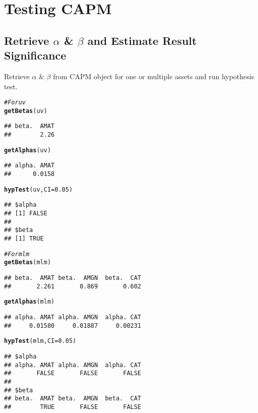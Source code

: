 \documentclass[a4paper]{article}\usepackage[]{graphicx}\usepackage[]{color}
\makeatletter
\newcommand{\hlnum}[1]{\textcolor[rgb]{0.686,0.059,0.569}{#1}}%
\newcommand{\hlcom}[1]{\textcolor[rgb]{0.678,0.584,0.686}{\textit{#1}}}%
\newcommand{\hlstd}[1]{\textcolor[rgb]{0.345,0.345,0.345}{#1}}%
\newcommand{\hlkwc}[1]{\textcolor[rgb]{0.333,0.667,0.333}{#1}}%
\newcommand{\hlkwd}[1]{\textcolor[rgb]{0.737,0.353,0.396}{\textbf{#1}}}%
\newenvironment{kframe}{%
 \def\at@end@of@kframe{}%
 \ifinner\ifhmode%
  \def\at@end@of@kframe{\end{minipage}}%
  \begin{minipage}{\columnwidth}%
 \fi\fi%
 \def\FrameCommand##1{\hskip\@totalleftmargin \hskip-\fboxsep
 \colorbox{shadecolor}{##1}\hskip-\fboxsep
     \hskip-\linewidth \hskip-\@totalleftmargin \hskip\columnwidth}%
 \MakeFramed {\advance\hsize-\width
   \@totalleftmargin\z@ \linewidth\hsize
   \@setminipage}}%
 {\par\unskip\endMakeFramed%
 \at@end@of@kframe}
\newenvironment{knitrout}{}{} %
\makeatother
\begin{document}
\section{Testing CAPM}
\subsection{Retrieve $\alpha$ \& $\beta$ and Estimate Result Significance}
Retrieve $\alpha$ \& $\beta$ from CAPM object for one or multiple assets and run hypothesis test.
\begin{knitrout}
\color{fgcolor}\begin{kframe}
\begin{alltt}
\hlcom{# For uv}
\hlkwd{getBetas}\hlstd{(uv)}
\end{alltt}
\begin{verbatim}
## beta.  AMAT 
##        2.26
\end{verbatim}
\begin{alltt}
\hlkwd{getAlphas}\hlstd{(uv)}
\end{alltt}
\begin{verbatim}
## alpha. AMAT 
##      0.0158
\end{verbatim}
\begin{alltt}
\hlkwd{hypTest}\hlstd{(uv,} \hlkwc{CI} \hlstd{=} \hlnum{0.05}\hlstd{)}
\end{alltt}
\begin{verbatim}
## $alpha
## [1] FALSE
## 
## $beta
## [1] TRUE
\end{verbatim}
\begin{alltt}
\hlcom{# For mlm}
\hlkwd{getBetas}\hlstd{(mlm)}
\end{alltt}
\begin{verbatim}
## beta.  AMAT beta.  AMGN  beta.  CAT 
##       2.261       0.869       0.602
\end{verbatim}
\begin{alltt}
\hlkwd{getAlphas}\hlstd{(mlm)}
\end{alltt}
\begin{verbatim}
## alpha. AMAT alpha. AMGN  alpha. CAT 
##     0.01580     0.01887     0.00231
\end{verbatim}
\begin{alltt}
\hlkwd{hypTest}\hlstd{(mlm,} \hlkwc{CI} \hlstd{=} \hlnum{0.05}\hlstd{)}
\end{alltt}
\begin{verbatim}
## $alpha
## alpha. AMAT alpha. AMGN  alpha. CAT 
##       FALSE       FALSE       FALSE 
## 
## $beta
## beta.  AMAT beta.  AMGN  beta.  CAT 
##        TRUE       FALSE       FALSE
\end{verbatim}
\end{kframe}
\end{knitrout}
\end{document}
